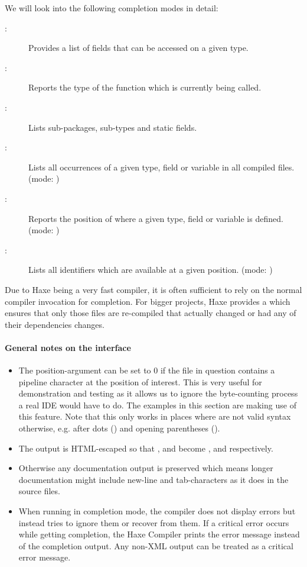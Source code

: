 We will look into the following completion modes in detail:

\begin{description}
    \item[:] Provides a list of fields that can be accessed on a given type.
    \item[:] Reports the type of the function which is currently being called.
    \item[:] Lists sub-packages, sub-types and static fields.
    \item[:] Lists all occurrences of a given type, field or variable in all compiled files. (mode: )
    \item[:] Reports the position of where a given type, field or variable is defined. (mode: )
    \item[:] Lists all identifiers which are available at a given position. (mode: )
\end{description}

Due to Haxe being a very fast compiler, it is often sufficient to rely on the normal compiler invocation for completion. For bigger projects, Haxe provides a  which ensures that only those files are re-compiled that actually changed or had any of their dependencies changes.

\paragraph{General notes on the interface}
\label{cr-completion-interface-notes}

\begin{itemize}
    \item The position-argument can be set to 0 if the file in question contains a pipeline \ic{|} character at the position of interest. This is very useful for demonstration and testing as it allows us to ignore the byte-counting process a real IDE would have to do. The examples in this section are making use of this feature. Note that this only works in places where \ic{|} are not valid syntax otherwise, e.g. after dots () and opening parentheses (\ic{(|}).
    \item The output is HTML-escaped so that \ic{\&}, \ic{<} and \ic{>} become ,  and  respectively.
    \item Otherwise any documentation output is preserved which means longer documentation might include new-line and tab-characters as it does in the source files.
    \item When running in completion mode, the compiler does not display errors but instead tries to ignore them or recover from them.  If a critical error occurs while getting completion, the Haxe Compiler prints the error message instead of the completion output. Any non-XML output can be treated as a critical error message.
\end{itemize}

